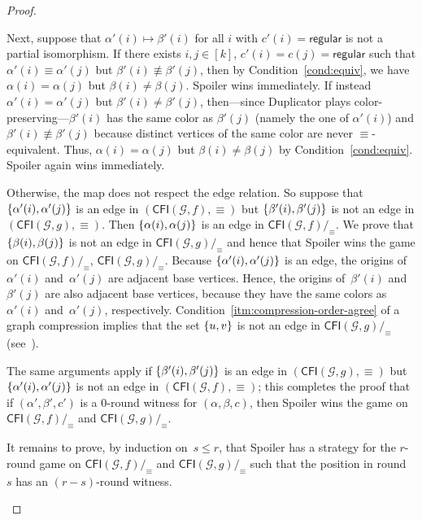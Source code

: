 \documentclass[a4paper,english, thm-restate]{lipics-v2021}
\DeclarePairedDelimiter\set{\lbrace}{\rbrace}
\newcommand{\regular}{\mathsf{regular}}
\newcommand{\comp}{\equiv}
\newcommand{\CFIsym}{\mathsf{CFI}}
\newcommand{\CFI}[1]{\CFIsym(#1)}
\newcommand{\compCFI}[2]{\CFI{#1}/_{#2}}
\newcommand{\precompCFI}[2]{{(\CFI{#1},#2)}}
\newcommand{\graphG}{\mathcal{G}}
\begin{document}
\begin{proof}
\begin{enumerate}
        Next, suppose that $\alpha'(i) \mapsto \beta'(i)$ for all $i$ with $c'(i) =\regular$
        is not a partial isomorphism. If there exists $i,j\in[k]$, $c'(i)=c(j)=\regular$ such that $\alpha'(i) \comp \alpha'(j)$ but $\beta'(i)\not\comp  \beta'(j)$, then
        by Condition~\ref{cond:equiv}, we have $\alpha(i)=\alpha(j)$ but $\beta(i)\neq \beta(j)$.
        Spoiler wins immediately.
        If instead $\alpha'(i) = \alpha'(j)$ but $\beta'(i) \neq \beta'(j)$,
        then---since Duplicator plays color-preserving---$\beta'(i)$ has the same color as $\beta'(j)$ (namely the one of $\alpha'(i)$)
        and $\beta'(i) \not\comp \beta'(j)$
        because distinct vertices of the same color are never $\comp$-\nobreakdash equivalent.
        Thus, $\alpha(i) = \alpha(j)$ but $\beta(i)\neq \beta(j)$ by Condition~\ref{cond:equiv}.
        Spoiler again wins immediately.
        
        Otherwise, the map does not respect the edge relation. So suppose that $\set{\alpha'(i),\alpha'(j)}$ is an edge in $\precompCFI{\graphG,f}{\comp}$
        but $\set{\beta'(i),\beta'(j)}$ is not an edge in $\precompCFI{\graphG,g}{\comp}$. Then $\set{\alpha(i),\alpha(j)}$ is an edge in $\compCFI{\graphG,f}{\comp}$.
        We prove that $\set{\beta(i),\beta(j)}$ is not an edge in $\compCFI{\graphG,g}{\comp}$ and hence that Spoiler wins the game on $\compCFI{\graphG,f}{\comp}$, $\compCFI{\graphG,g}{\comp}$.
        Because $\set{\alpha'(i),\alpha'(j)}$ is an edge,
        the origins of~$\alpha'(i)$ and~$\alpha'(j)$ are adjacent base vertices.
        Hence, the origins of~$\beta'(i)$ and~$\beta'(j)$ are also adjacent base vertices,
        because they have the same colors as~$\alpha'(i)$ and~$\alpha'(j)$, respectively.
       	Condition~\ref{itm:compression-order-agree} of a graph compression
       	implies that the set $\set{u,v}$ is not an edge in $\compCFI{\graphG,g}{\comp}$
       	(see~\cite[Lemma 11]{GroheLichterNeuenSchweitzer2023Arxiv}).
        
        The same arguments apply if $\set{\beta'(i),\beta'(j)}$ is an edge in $\precompCFI{\graphG,g}{\comp}$ but $\set{\alpha'(i),\alpha'(j)}$ is not an edge in $\precompCFI{\graphG,f}{\comp}$; this completes the proof that if $(\alpha', \beta', c')$ is a $0$\nobreakdash-round witness for $(\alpha,\beta,c)$, then Spoiler wins the game on $\compCFI{\graphG,f}{\comp}$ and $\compCFI{\graphG,g}{\comp}$. 
        
        It remains to prove, by induction on~$s\leq r$,
 that Spoiler has a strategy for the $r$\nobreakdash-round game on $\compCFI{\graphG,f}{\comp}$ and $\compCFI{\graphG,g}{\comp}$ such that the position in round~$s$ has an $(r-s)$\nobreakdash-round witness. 


\end{enumerate}
\end{proof}
\end{document}
